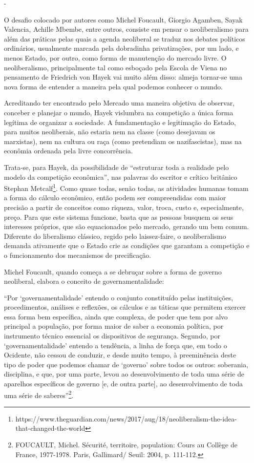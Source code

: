 -

O desafio colocado por autores como Michel Foucault, Giorgio Agamben,
Sayak Valencia, Achille Mbembe, entre outros, consiste em pensar o
neoliberalismo para além das práticas pelas quais a agenda neoliberal se
traduz nos debates políticos ordinários, usualmente marcada pela
dobradinha privatizações, por um lado, e menos Estado, por outro, como
forma de manutenção do mercado livre. O neoliberalismo, principalmente
tal como esboçado pela Escola de Viena no pensamento de Friedrich von
Hayek vai muito além disso: almeja tornar-se uma nova forma de entender
a maneira pela qual podemos conhecer o mundo.

Acreditando ter encontrado pelo Mercado uma maneira objetiva de
observar, conceber e planejar o mundo, Hayek vislumbra na competição a
única forma legítima de organizar a sociedade. A fundamentação e
legitimação do Estado, para muitos neoliberais, não estaria nem na
classe (como desejavam os marxistas), nem na cultura ou raça (como
pretendiam os nazifascistas), mas na econômia ordenada pela livre
concorrência.

Trata-se, para Hayek, da possibilidade de ``estruturar toda a realidade
pelo modelo da competição econômica'', nas palavras do escritor e
crítico britânico Stephan Metcalf\footnote{https://www.theguardian.com/news/2017/aug/18/neoliberalism-the-idea-that-changed-the-world}.
Como quase todas, senão todas, as atividades humanas tomam a forma do
cálculo econômico, então podem ser compreendidas com maior precisão a
partir de conceitos como riqueza, valor, troca, custo e, especialmente,
preço. Para que este sistema funcione, basta que as pessoas busquem os
seus interesses próprios, que são equacionados pelo mercado, gerando um
bem comum. Diferente do liberalismo clássico, regido pelo laissez-faire,
o neoliberalismo demanda ativamente que o Estado crie as condições que
garantam a competição e o funcionamento dos mecanismos de precificação.

Michel Foucault, quando começa a se debruçar sobre a forma de governo
neoliberal, elabora o conceito de governamentalidade:

``Por `governamentalidade' entendo o conjunto constituído pelas
instituições, procedimentos, análises e reﬂexões, os cálculos e as
táticas que permitem exercer essa forma bem especíﬁca, ainda que
complexa, de poder que tem por alvo principal a população, por forma
maior de saber a economia política, por instrumento técnico essencial os
dispositivos de segurança. Segundo, por `governamentalidade' entendo a
tendência, a linha de força que, em todo o Ocidente, não cessou de
conduzir, e desde muito tempo, à preeminência deste tipo de poder que
podemos chamar de `governo' sobre todos os outros: soberania,
disciplina, e que, por uma parte, levou ao desenvolvimento de toda uma
série de aparelhos especíﬁcos de governo {[}e, de outra parte{]}, ao
desenvolvimento de toda uma série de saberes''\footnote{FOUCAULT,
  Michel. Sécurité, territoire, population: Cours au Collège de France,
  1977-1978. Paris, Gallimard/ Seuil: 2004, p. 111-112.}.

